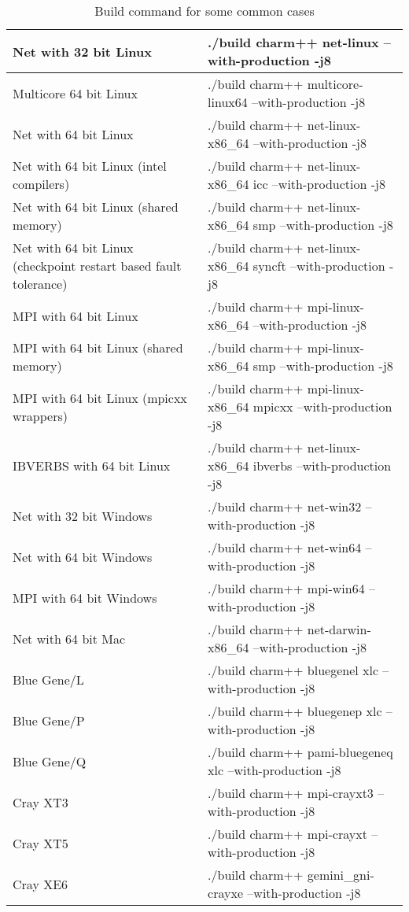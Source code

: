 \begin{table}[ht]
\begin{tabular}{|p{6cm}|p{9cm}|}
\hline
Net with 32 bit Linux & ./build charm++ net-linux --with-production -j8
\\\hline
Multicore 64 bit Linux & ./build charm++ multicore-linux64 --with-production -j8
\\\hline
Net with 64 bit Linux & ./build charm++ net-linux-x86\_64 --with-production -j8
\\\hline
Net with 64 bit Linux (intel compilers) & ./build charm++ net-linux-x86\_64 icc --with-production -j8
\\\hline
Net with 64 bit Linux (shared memory) & ./build charm++ net-linux-x86\_64 smp --with-production -j8
\\\hline
Net with 64 bit Linux (checkpoint restart based fault tolerance) & ./build charm++ net-linux-x86\_64 syncft --with-production -j8
\\\hline
MPI with 64 bit Linux & ./build charm++ mpi-linux-x86\_64 --with-production -j8
\\\hline
MPI with 64 bit Linux (shared memory) & ./build charm++ mpi-linux-x86\_64 smp --with-production -j8
\\\hline
MPI with 64 bit Linux (mpicxx wrappers) & ./build charm++ mpi-linux-x86\_64 mpicxx --with-production -j8
\\\hline
IBVERBS with 64 bit Linux & ./build charm++ net-linux-x86\_64 ibverbs --with-production -j8
\\\hline
Net with 32 bit Windows & ./build charm++ net-win32 --with-production -j8
\\\hline
Net with 64 bit Windows & ./build charm++ net-win64 --with-production -j8
\\\hline
MPI with 64 bit Windows & ./build charm++ mpi-win64 --with-production -j8
\\\hline
Net with 64 bit Mac & ./build charm++ net-darwin-x86\_64 --with-production -j8
\\\hline
Blue Gene/L & ./build charm++ bluegenel xlc --with-production -j8
\\\hline
Blue Gene/P & ./build charm++ bluegenep xlc --with-production -j8
\\\hline
Blue Gene/Q & ./build charm++ pami-bluegeneq xlc --with-production -j8
\\\hline
Cray XT3 & ./build charm++ mpi-crayxt3 --with-production -j8
\\\hline
Cray XT5 & ./build charm++ mpi-crayxt --with-production -j8
\\\hline
Cray XE6 & ./build charm++ gemini\_gni-crayxe --with-production -j8
\\\hline
\end{tabular}
\caption{Build command for some common cases}
\label{tab:buildlist}
\end{table}


